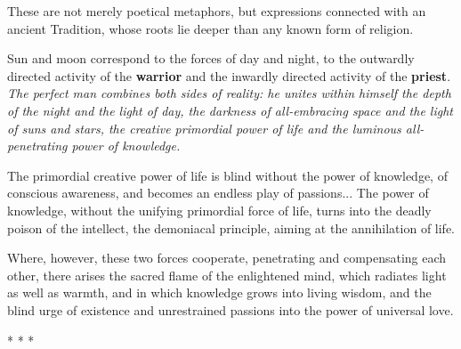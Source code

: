 \begin{quotationx}
These are not merely poetical metaphors, but expressions connected with an ancient Tradition, whose roots lie deeper than any known form of religion.

Sun and moon correspond to the forces of day and night, to the outwardly directed activity of the \textbf{warrior} and the inwardly directed activity of the \textbf{priest}. \emph{The perfect man combines both sides of reality: he unites within himself the depth of the night and the light of day, the darkness of all-embracing space and the light of suns and stars, the creative primordial power of life and the luminous all-penetrating power of knowledge.}

The primordial creative power of life is blind without the power of knowledge, of conscious awareness, and becomes an endless play of passions... The power of knowledge, without the unifying primordial force of life, turns into the deadly poison of the intellect, the demoniacal principle, aiming at the annihilation of life.

Where, however, these two forces cooperate, penetrating and compensating each other, there arises the sacred flame of the enlightened mind, which radiates light as well as warmth, and in which knowledge grows into living wisdom, and the blind urge of existence and unrestrained passions into the power of universal love.
\end{quotationx}




\begin{center}* * *\end{center}

